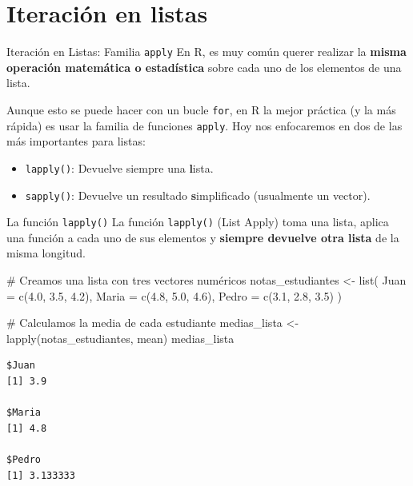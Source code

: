 \documentclass[
  ignorenonframetext,
  aspectratio=169,
  spanish,
]{beamer}
\newenvironment{Shaded}{\begin{snugshade}}{\end{snugshade}}
\newcommand{\AttributeTok}[1]{\textcolor[rgb]{0.40,0.45,0.13}{#1}}
\newcommand{\CommentTok}[1]{\textcolor[rgb]{0.37,0.37,0.37}{#1}}
\newcommand{\FloatTok}[1]{\textcolor[rgb]{0.68,0.00,0.00}{#1}}
\newcommand{\FunctionTok}[1]{\textcolor[rgb]{0.28,0.35,0.67}{#1}}
\newcommand{\NormalTok}[1]{\textcolor[rgb]{0.00,0.23,0.31}{#1}}
\newcommand{\OtherTok}[1]{\textcolor[rgb]{0.00,0.23,0.31}{#1}}
\providecommand{\tightlist}{%
  \setlength{\itemsep}{0pt}\setlength{\parskip}{0pt}}
\begin{document}
\section{Iteración en listas}\label{iteraciuxf3n-en-listas}

\begin{frame}[fragile]{Iteración en Listas: Familia \texttt{apply}}
\label{iteraciuxf3n-en-listas-familia-apply}
En R, es muy común querer realizar la \textbf{misma operación matemática
o estadística} sobre cada uno de los elementos de una lista.

Aunque esto se puede hacer con un bucle \texttt{for}, en R la mejor
práctica (y la más rápida) es usar la familia de funciones
\texttt{apply}. Hoy nos enfocaremos en dos de las más importantes para
listas:

\begin{itemize}
\tightlist
\item
  \texttt{lapply()}: Devuelve siempre una \textbf{l}ista.
\item
  \texttt{sapply()}: Devuelve un resultado \textbf{s}implificado
  (usualmente un vector).
\end{itemize}
\end{frame}

\begin{frame}[fragile]{La función \texttt{lapply()}}
\label{la-funciuxf3n-lapply}
La función \texttt{lapply()} (List Apply) toma una lista, aplica una
función a cada uno de sus elementos y \textbf{siempre devuelve otra
lista} de la misma longitud.

\begin{Shaded}
\begin{Highlighting}[]
\CommentTok{\# Creamos una lista con tres vectores numéricos}
\NormalTok{notas\_estudiantes }\OtherTok{\textless{}{-}} \FunctionTok{list}\NormalTok{(}
  \AttributeTok{Juan =} \FunctionTok{c}\NormalTok{(}\FloatTok{4.0}\NormalTok{, }\FloatTok{3.5}\NormalTok{, }\FloatTok{4.2}\NormalTok{),}
  \AttributeTok{Maria =} \FunctionTok{c}\NormalTok{(}\FloatTok{4.8}\NormalTok{, }\FloatTok{5.0}\NormalTok{, }\FloatTok{4.6}\NormalTok{),}
  \AttributeTok{Pedro =} \FunctionTok{c}\NormalTok{(}\FloatTok{3.1}\NormalTok{, }\FloatTok{2.8}\NormalTok{, }\FloatTok{3.5}\NormalTok{)}
\NormalTok{)}

\CommentTok{\# Calculamos la media de cada estudiante}
\NormalTok{medias\_lista }\OtherTok{\textless{}{-}} \FunctionTok{lapply}\NormalTok{(notas\_estudiantes, mean)}
\NormalTok{medias\_lista}
\end{Highlighting}
\end{Shaded}

\begin{verbatim}
$Juan
[1] 3.9

$Maria
[1] 4.8

$Pedro
[1] 3.133333
\end{verbatim}
\end{frame}
\end{document}
